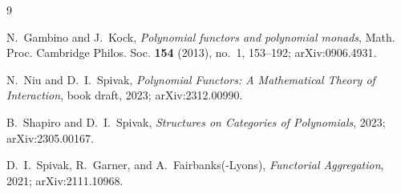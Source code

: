 \documentclass[11pt]{amsart}
\theoremstyle{plain}
\theoremstyle{definition}
\theoremstyle{remark}
\begin{document}
\begin{thebibliography}{9}

N.~Gambino and J.~Kock,
\emph{Polynomial functors and polynomial monads},
Math. Proc. Cambridge Philos. Soc. \textbf{154} (2013), no.~1, 153--192; arXiv:0906.4931.

N.~Niu and D.~I.~Spivak,
\emph{Polynomial Functors: A Mathematical Theory of Interaction}, book draft, 2023; arXiv:2312.00990.

B.~Shapiro and D.~I.~Spivak,
\emph{Structures on Categories of Polynomials}, 2023; arXiv:2305.00167.

D.~I.~Spivak, R.~Garner, and A.~Fairbanks(-Lyons),
\emph{Functorial Aggregation}, 2021; arXiv:2111.10968.

\end{thebibliography}
\end{document}
